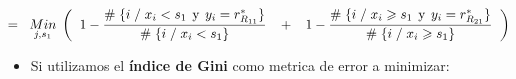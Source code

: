 \documentclass[
  11pt,
  a4paper,
]{article}
\providecommand{\tightlist}{%
  \setlength{\itemsep}{0pt}\setlength{\parskip}{0pt}}
\begin{document}
\begin{gather*}
=\hspace{0.2cm}   \underset{j  ,  s_1}  {Min} \hspace{0.1cm} \left( \hspace{0.2cm}    1 - \dfrac{\# \hspace{0.1 cm}\lbrace i \hspace{0.1 cm}/\hspace{0.1 cm} x_i < s_1 \hspace{0.15 cm}\text{y}\hspace{0.15 cm} y_i = r^*_{R_{11}} \rbrace}{\# \hspace{0.1 cm}\lbrace i \hspace{0.1 cm}/\hspace{0.1 cm} x_i < s_1  \rbrace} \hspace{0.3cm} +  \hspace{0.3cm}      1 - \dfrac{\# \hspace{0.1 cm}\lbrace i \hspace{0.1 cm}/\hspace{0.1 cm} x_i \geqslant s_1 \hspace{0.15 cm}\text{y}\hspace{0.15 cm} y_i = r^*_{R_{21}} \rbrace}{\# \hspace{0.1 cm}\lbrace i \hspace{0.1 cm}/\hspace{0.1 cm} x_i \geqslant s_1 \rbrace}    \hspace{0.2cm} \right)    
\end{gather*}

\begin{itemize}
\tightlist
\item
  Si utilizamos el \textbf{índice de Gini} como metrica de error a
  minimizar:
\end{itemize}
\end{document}
